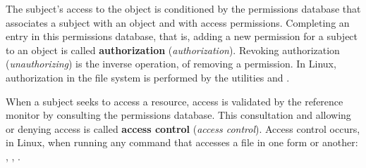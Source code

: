 The subject's access to the object is conditioned by the permissions database that associates a subject with an object and with access permissions.
Completing an entry in this permissions database, that is, adding a new permission for a subject to an object is called \textbf{authorization} (\textit{authorization}).
Revoking authorization (\textit{unauthorizing}) is the inverse operation, of removing a permission.
In Linux, authorization in the file system is performed by the utilities  and .

When a subject seeks to access a resource, access is validated by the reference monitor by consulting the permissions database.
This consultation and allowing or denying access is called \textbf{access control} (\textit{access control}).
Access control occurs, in Linux, when running any command that accesses a file in one form or another: , , . 